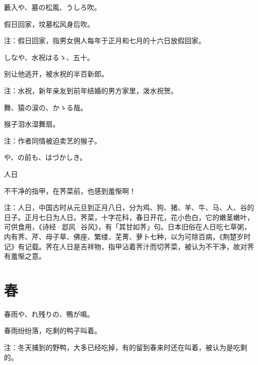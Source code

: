 \begin{haiku}
    {\FH 藪入や、墓の松風、うしろ吹。}

    {\FK 假日回家，坟墓松风身后吹。}

    {\FT 注：假日回家，指男女佣人每年于正月和七月的十六日放假回家。}
\end{haiku}

\begin{haiku}
    {\FH {}しなや、水祝はるゝ、五十。}

    {\FK 别让他逃开，被水祝的半百新郎。}

    {\FT 注：水祝，新年亲友到前年结婚的男方家里，泼水祝贺。}
\end{haiku}

\begin{haiku}
    {\FH 舞、猿の涙の、かゝる哉。}

    {\FK 猴子泪水湿舞扇。}

    {\FT 注：作者同情被迫卖艺的猴子。}
\end{haiku}

\begin{haiku}
    {\FH {}や、の前も、はづかしき。}

    {\FK 人日}

    {\FK 不干净的指甲，在荠菜前，也感到羞惭啊！}

    {\FT 注：人日，中国古时从元旦到正月八日，分为鸡、狗、猪、羊、牛、马、人、谷的日子。正月七日为人日。荠菜，十字花科，春日开花，花小色白，它的嫩茎嫩叶，可供食用，《诗经·邶风·谷风》，有「其甘如荠」句。日本旧俗在人日吃七草粥，内有荠、芹、母子草、佛座、繁缕、芜菁、萝卜七种，以为可除百病，《荆楚岁时记》有记载。荠在人日是吉祥物，指甲沾着荠汁而切荠菜，被认为不干净，故对荠有羞惭之意。}
\end{haiku}

\section{\FK 春}

\setcounter{haikucounter}{0}

\begin{haiku}
    {\FH 春雨や、れ残りの、鴨が鳴。}

    {\FK 春雨纷纷落，吃剩的鸭子叫着。}

    {\FT 注：冬天捕到的野鸭，大多已经吃掉，有的留到春来时还在叫着，被认为是吃剩的。}
\end{haiku}

